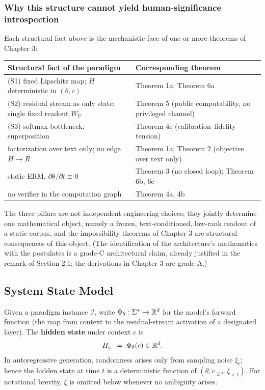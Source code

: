 \subsubsection{Why this structure cannot yield human-significance introspection}

Each structural fact above is the mechanistic face of one or more theorems of Chapter 3:

\begin{center}
\small
\begin{tabular}{p{9.0cm}p{5.6cm}}
\toprule
Structural fact of the paradigm & Corresponding theorem \\
\midrule
(S1) fixed Lipschitz map; $H$ deterministic in $(\theta,c)$ & Theorem 1a; Theorem 6a \\
(S2) residual stream as only state; single fixed readout $W_{U}$ & Theorem 5 (public computability, no privileged channel) \\
(S3) softmax bottleneck; superposition & Theorem 4c (calibration--fidelity tension) \\
factorization over text only; no edge $H \to R$ & Theorem 1a; Theorem 2 (objective over text only) \\
static ERM, $\partial\theta/\partial t \equiv 0$ & Theorem 3 (no closed loop); Theorem 6b, 6c \\
no verifier in the computation graph & Theorem 4a, 4b \\
\bottomrule
\end{tabular}
\end{center}

The three pillars are not independent engineering choices; they jointly determine one
mathematical object, namely a frozen, text-conditioned, low-rank readout of a static
corpus, and the impossibility theorems of Chapter 3 are structural consequences of this
object.
(The identification of the architecture's mathematics with the postulates is a grade-C
architectural claim, already justified in the remark of Section 2.1; the derivations in
Chapter 3 are grade A.)

\clearpage
\subsection{System State Model}

\begin{definition}\label{def:forward}
Given a paradigm instance $\mathcal{I}$, write $\Phi_\theta: \Sigma^{*} \to \mathbb{R}^{d}$ for the
model's forward function (the map from context to the residual-stream activation of a
designated layer). The \textbf{hidden state} under context $c$ is
\begin{equation}
H_c \;:=\; \Phi_\theta(c) \in \mathbb{R}^{d}.
\label{eq:hidden}
\end{equation}
In autoregressive generation, randomness arises only from sampling noise $\xi_t$; hence the
hidden state at time $t$ is a deterministic function of $(\theta, c_{\le t}, \xi_{<t})$. For
notational brevity, $\xi$ is omitted below whenever no ambiguity arises.
\end{definition}

